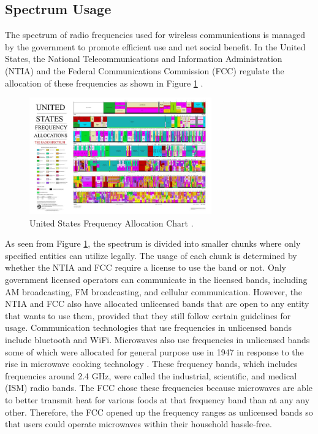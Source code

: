 \subsection{Spectrum Usage}
The spectrum of radio frequencies used for wireless communications is managed by the government to promote efficient use and net social benefit. In the United States, the National Telecommunications and Information Administration (NTIA) and the Federal Communications Commission (FCC) regulate the allocation of these frequencies as shown in Figure \ref{fig:freq_chart} \cite{FCC_Info}. 
\begin{figure}[h!]
\centering
\includegraphics[width=0.70\textwidth]{img/the_radio_spectrum.jpg}
\caption{United States Frequency Allocation Chart \cite{FCC_Info}.}
\label{fig:freq_chart}
\end{figure}
As seen from Figure \ref{fig:freq_chart}, the spectrum is divided into smaller chunks where only specified entities can utilize legally. The usage of each chunk is determined by whether the NTIA and FCC require a license to use the band or not. Only government licensed operators can communicate in the licensed bands, including AM broadcasting, FM broadcasting, and cellular communication. However, the NTIA and FCC also have allocated unlicensed bands that are open to any entity that wants to use them, provided that they still follow certain guidelines for usage. Communication technologies that use frequencies in unlicensed bands include bluetooth and WiFi. Microwaves also use frequencies in unlicensed bands some of which were allocated for general purpose use in 1947 in response to the rise in microwave cooking technology \cite{FCC1947}. These frequency bands, which includes frequencies around 2.4 GHz, were called the industrial, scientific, and medical (ISM) radio bands. The FCC chose these frequencies because microwaves are able to better transmit heat for various foods at that frequency band than at any any other.  Therefore, the FCC opened up the frequency ranges as unlicensed bands so that users could operate microwaves within their household hassle-free. 

